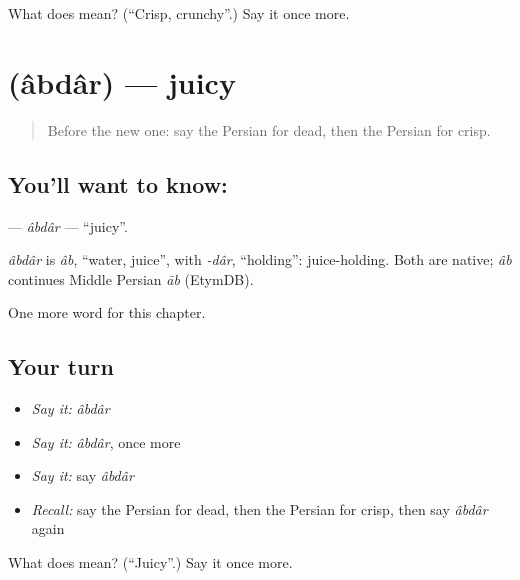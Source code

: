 \begin{tcolorbox}[breakable,colback=teal!4,colframe=teal!35!black,title={Before you move on}]
What does  mean? (\textquotedblleft{}Crisp, crunchy\textquotedblright{}.) Say it once more.
\end{tcolorbox}
\section[\texorpdfstring{\fa{آبدار} (âbdâr)}{آبدار (âbdâr)}]{ (âbdâr) — juicy}

\label{lesson:FA-C238-abdar}



\begin{quote}
Before the new one: say the Persian for dead, then the Persian for crisp.
\end{quote}

\subsection*{You'll want to know: }
\textbf{} — \emph{âbdâr} — \textquotedblleft{}juicy\textquotedblright{}.

\begin{cousinweb}
\emph{âbdâr} is \emph{âb}, \textquotedblleft{}water, juice\textquotedblright{}, with \emph{-dâr}, \textquotedblleft{}holding\textquotedblright{}: juice-holding. Both are native; \emph{âb} continues Middle Persian \emph{āb} (EtymDB).
\end{cousinweb}

\begin{grammarlens}[title={What you've built}]
One more word for this chapter.
\end{grammarlens}

\subsection*{Your turn}
\begin{itemize}
\raggedright
  \item \emph{Say it:} \emph{âbdâr}
  \item \emph{Say it:} \emph{âbdâr}, once more
  \item \emph{Say it:} say \emph{âbdâr}
  \item \emph{Recall:} say the Persian for dead, then the Persian for crisp, then say \emph{âbdâr} again
\end{itemize}

\begin{tcolorbox}[breakable,colback=teal!4,colframe=teal!35!black,title={Before you move on}]
What does  mean? (\textquotedblleft{}Juicy\textquotedblright{}.) Say it once more.
\end{tcolorbox}
